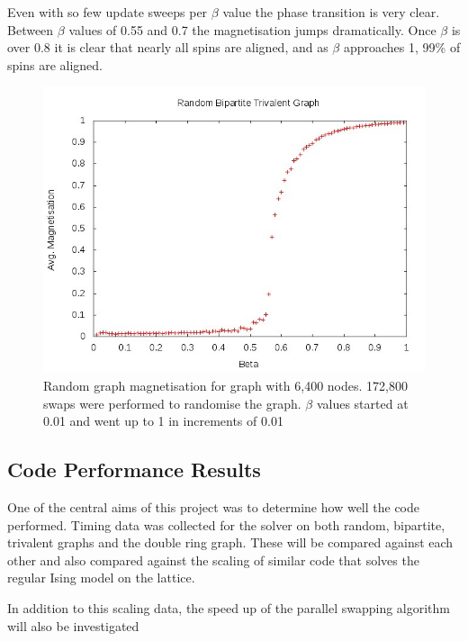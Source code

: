 \documentclass[pdftex,12pt,a4paper]{article}
\begin{document}
Even with so few update sweeps per $\beta$ value the phase transition is very clear. Between $\beta$ values of 0.55 and 0.7 the magnetisation jumps dramatically. Once $\beta$ is over 0.8 it is clear that nearly all spins are aligned, and as $\beta$ approaches 1, 99\% of spins are aligned.

\begin{figure}
\centering
\includegraphics[scale=0.8]{rand_mag.jpg}
\caption{Random graph magnetisation for graph with 6,400 nodes. 172,800 swaps were performed to randomise the graph. $\beta$ values started at 0.01 and went up to 1 in increments of 0.01}
\end{figure}





\subsection{Code Performance Results}

One of the central aims of this project was to determine how well the code performed. Timing data was collected for the solver on both random, bipartite, trivalent graphs and the double ring graph. These will be compared against each other and also compared against the scaling of similar code that solves the regular Ising model on the lattice.

In addition to this scaling data, the speed up of the parallel swapping algorithm will also be investigated

\end{document}
